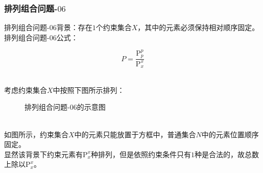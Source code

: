 \documentclass[UTF8]{ctexart}
\newcommand{\rnum}[1]{\uppercase\expandafter{\romannumeral #1\relax}}
\begin{document}
\subsubsection{排列组合问题\rnum{1}-$06$}
    排列组合问题\rnum{1}-$06$背景：存在$1$个约束集合$X$，其中的元素必须保持相对顺序固定。\\[3mm]
    排列组合问题\rnum{1}-$06$公式：
    \begin{large}
        \begin{equation*}
            P=\frac{\mathrm{P}_p^p}{\mathrm{P}_x^x}
        \end{equation*}
    \end{large}\\
    考虑约束集合$X$中按照下图所示排列：\vspace{5pt}
    \begin{figure}[h]
        \begin{center}
            \caption{排列组合问题\rnum{1}-$06$的示意图}
        \end{center}
    \end{figure}\\
    如图所示，约束集合$X$中的元素只能放置于方框中，普通集合$N$中的元素位置顺序固定。\\[3mm]
    显然该背景下约束元素有$\mathrm{P}_x^x$种排列，但是依照约束条件只有$1$种是合法的，故总数上除以$\mathrm{P}_x^x$。\\
\end{document}
